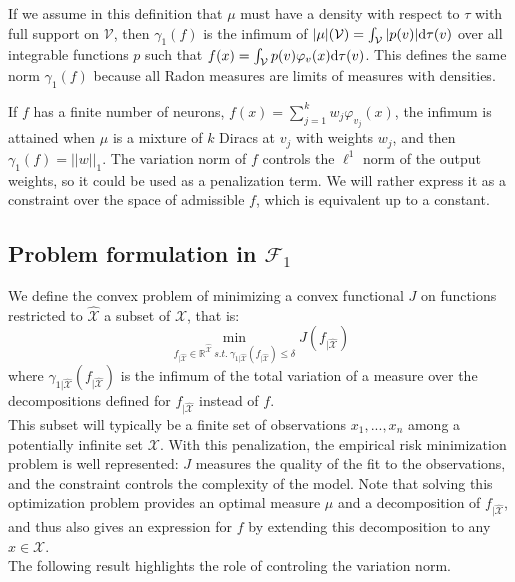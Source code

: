 \documentclass[a4paper, 11pt]{scrartcl}
\begin{document}
{If we assume in this definition that $\mu$ must have a density with respect to $\tau$ with full support on $\mathcal{V}$, then $\gamma_1(f)$ is the infimum of $|\mu|(\mathcal{V}) = \int_\mathcal{V} |p(v)| \textnormal{d}\tau(v)$ over all integrable functions $p$ such that $f(x) = \int_\mathcal{V} p(v) \varphi_v(x)\textnormal{d}\tau(v)$. This defines the same norm $\gamma_1(f)$ because all Radon measures are limits of measures with densities.

If $f$ has a finite number of neurons, $f(x) = \sum_{j=1}^k w_j \varphi_{v_j}(x)$, the infimum is attained when $\mu$ is a mixture of $k$ Diracs at $v_j$ with weights $w_j$, and then $\gamma_1(f) = ||w||_1$. The variation norm of $f$ controls the $\ell^1$ norm of the output weights, so it could be used as a penalization term. We will rather express it as a constraint over the space of admissible $f$, which is equivalent up to a constant.

\subsection{Problem formulation in $\mathcal{F}_1$}

We define the convex problem of minimizing a convex functional $J$ on functions restricted to $\mathcal{\hat X}$ a subset of $\mathcal{X}$, that is:
\begin{equation}
\min_{f_{|\mathcal{\hat X}} \in \mathbb{R}^\mathcal{\hat X}~ s.t. ~ \gamma_{1|\mathcal{\hat X}} (f_{|\mathcal{\hat X}}) \leq \delta} J(f_{|\mathcal{\hat X}})
\end{equation}
where $\gamma_{1|\mathcal{\hat X}} (f_{|\mathcal{\hat X}})$ is the infimum of the total variation of a measure over the decompositions defined for $f_{|\mathcal{\hat X}}$ instead of $f$.\\

This subset will typically be a finite set of observations $x_1,...,x_n$ among a potentially infinite set $\mathcal{X}$. With this penalization, the empirical risk minimization problem is well represented: $J$ measures the quality of the fit to the observations, and the constraint controls the complexity of the model. Note that solving this optimization problem provides an optimal measure $\mu$ and a decomposition of $f_{|\mathcal{\hat X}}$, and thus also gives an expression for $f$ by extending this decomposition to any $x\in \mathcal{X}$. \\

The following result highlights the role of controling the variation norm.

}
\end{document}
